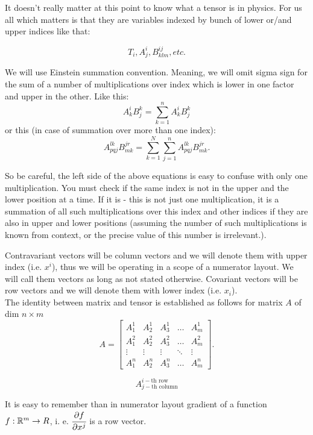 \documentclass[main.tex]{subfiles}
\begin{document}
It doesn't really matter at this point to know what a tensor is in physics. For us all which matters is that they are variables indexed by bunch of lower or/and upper indices like that:

$$
T_i, A^i_j, B^{ij}_{klm}, etc.
$$


We will use Einstein summation convention. Meaning, we will omit sigma sign for the sum of a number of multiplications over index which is lower in one factor and upper in the other. Like this:
$$
A^i_k B^k_j = \sum_{k = 1}^n A^i_k B^k_j
$$
or this (in case of summation over more than one index):
$$
A_{pqj}^{lk}B^{jr}_{mk} = \sum_{k = 1}^N\sum_{j = 1}^n A_{pqj}^{lk}B^{jr}_{mk}.
$$

So be careful, the left side of the above equations is easy to confuse with only one multiplication. You must check if the same index is not in the upper and the lower position at a time. If it is - this is not just one multiplication, it is a summation of all such multiplications over this index and other indices if they are also in upper and lower positions (assuming the number of such multiplications is known from context, or the precise value of this number is irrelevant.).

Contravariant vectors will be column vectors and we will denote them with upper index (i.e. $x^i$), thus
we will be operating in a scope of a numerator layout. We will call them vectors as long as not stated otherwise. Covariant vectors will be row vectors and we will denote them with lower index (i.e. $x_i$).\\
The identity between matrix and tensor is established as follows for matrix $A$ of dim $n \times m$
\begin{equation}
A = \begin{bmatrix}
    A^1_1 & A^1_2 & A^1_3 & \dots  & A^1_m \\
    A^2_1 & A^2_2 & A^2_3 & \dots  & A^2_m \\
    \vdots & \vdots & \vdots & \ddots & \vdots \\
    A^n_1 & A^n_2 & A^n_3 & \dots  & A^n_m
\end{bmatrix}.
\end{equation}

\begin{equation}
A^{i-\text{th row}}_{j-\text{th column}}
\end{equation}


It is easy to remember than in numerator layout gradient of a function $f:\mathbb{R}^m\to R$, i. e. $\cfrac{\partial f}{\partial x^j}$ is a row vector.
\end{document}
